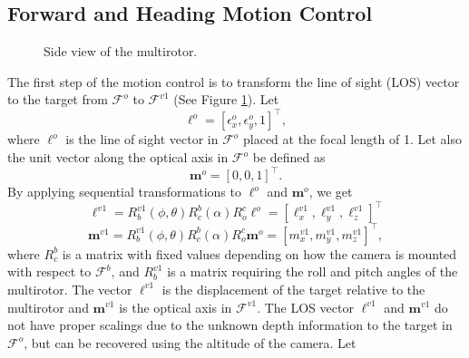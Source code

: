 \subsection{Forward and Heading Motion Control}
\begin{figure}[thpb]
	\centering
	\caption{Side view of the multirotor.}
	\label{side_view}
\end{figure}
The first step of the motion control is to transform the line of sight (LOS) vector to the target from $\mathcal{F}^o$ to $\mathcal{F}^{v1}$ (See Figure \ref{side_view}). Let 
\begin{equation}
\mathbf{\ell}^o=[\epsilon_x^o, \epsilon_y^o, 1]^\top,
\end{equation} where $\ell^o$ is the line of sight vector in $\mathcal{F}^o$ placed at the focal length of 1. Let also the unit vector along the optical axis in $\mathcal{F}^o$ be defined as 
\begin{equation}
\mathbf{m}^o=[0, 0, 1]^\top.
\end{equation}
By applying sequential transformations to $\ell^o$ and $\mathbf{m}^o$, we get
\begin{equation}
\mathbf{\ell}^{v1}=R^{v1}_b(\phi,\theta)R^b_c(\alpha)R^c_o\ell^o=[\ell^{v1}_x, \ell^{v1}_y, \ell^{v1}_z]^\top
\end{equation}
\begin{equation}
\mathbf{m}^{v1}=R^{v1}_b(\phi,\theta)R^b_c(\alpha)R^c_o\mathbf{m}^o=[m^{v1}_x, m^{v1}_y, m^{v1}_z]^\top,
\end{equation} where $R^b_c$ is a matrix with fixed values depending on how the camera is mounted with respect to $\mathcal{F}^b$, and $R^{v1}_b$ is a matrix requiring the roll and pitch angles of the multirotor. The vector $\ell^{v1}$ is the displacement of the target relative to the multirotor and $\mathbf{m}^{v1}$ is the optical axis in $\mathcal{F}^{v1}$. The LOS vector $\ell^{v1}$ and $\mathbf{m}^{v1}$ do not have proper scalings due to the unknown depth information to the target in $\mathcal{F}^o$, but can be recovered using the altitude of the camera. Let
